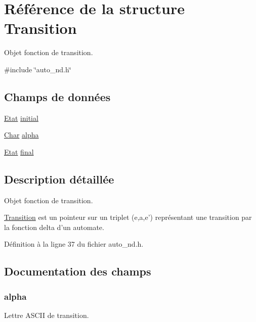 \hypertarget{struct_transition}{\section{\-Référence de la structure \-Transition}
\label{struct_transition}
}


\-Objet fonction de transition.  




{\ttfamily \#include \char`\"{}auto\-\_\-nd.\-h\char`\"{}}

\subsection*{\-Champs de données}
\begin{DoxyCompactItemize}
\item 
\hyperlink{auto__nd_8h_aae0c86cf5eb18ae170b50062873cb0c1}{\-Etat} \hyperlink{struct_transition_a90d9e6858a2ca20ec81be04500590396}{initial}
\item 
\hyperlink{auto__nd_8h_a725c798f5e7ed9a07c672cb966f35ce1}{\-Char} \hyperlink{struct_transition_ad41be56e69e85f38f4be7cc7d7d3cc18}{alpha}
\item 
\hyperlink{auto__nd_8h_aae0c86cf5eb18ae170b50062873cb0c1}{\-Etat} \hyperlink{struct_transition_abbe5fcc45cc44e9057bc028de5aed8a0}{final}
\end{DoxyCompactItemize}


\subsection{\-Description détaillée}
\-Objet fonction de transition. 

\hyperlink{struct_transition}{\-Transition} est un pointeur sur un triplet (e,a,e') représentant une transition par la fonction delta d'un automate. 

\-Définition à la ligne 37 du fichier auto\-\_\-nd.\-h.



\subsection{\-Documentation des champs}
\hypertarget{struct_transition_ad41be56e69e85f38f4be7cc7d7d3cc18}{
\subsubsection[{alpha}]{ {\bf alpha}}}\label{struct_transition_ad41be56e69e85f38f4be7cc7d7d3cc18}
\-Lettre \-A\-S\-C\-I\-I de transition. 

